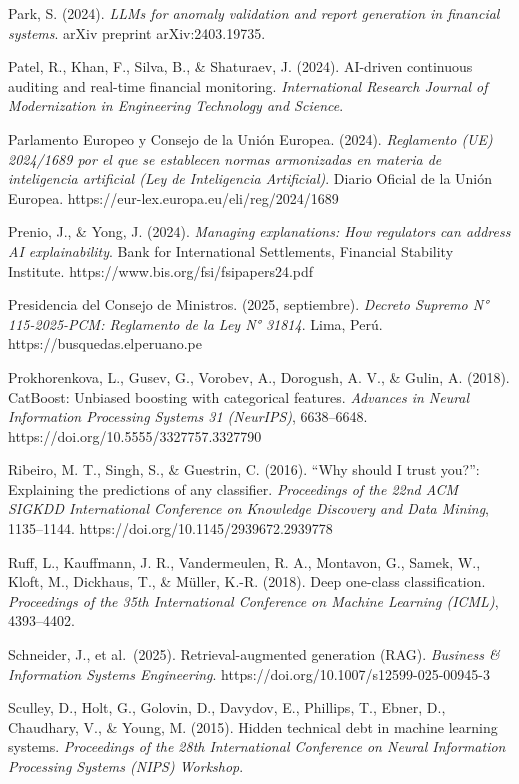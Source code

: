 Park, S. (2024). \emph{LLMs for anomaly validation and report generation
in financial systems}. arXiv preprint arXiv:2403.19735.

Patel, R., Khan, F., Silva, B., \& Shaturaev, J. (2024). AI-driven
continuous auditing and real-time financial monitoring.
\emph{International Research Journal of Modernization in Engineering
Technology and Science}.

Parlamento Europeo y Consejo de la Unión Europea. (2024).
\emph{Reglamento (UE) 2024/1689 por el que se establecen normas
armonizadas en materia de inteligencia artificial (Ley de Inteligencia
Artificial)}. Diario Oficial de la Unión Europea.
https://eur-lex.europa.eu/eli/reg/2024/1689

Prenio, J., \& Yong, J. (2024). \emph{Managing explanations: How
regulators can address AI explainability}. Bank for International
Settlements, Financial Stability Institute.
https://www.bis.org/fsi/fsipapers24.pdf

Presidencia del Consejo de Ministros. (2025, septiembre). \emph{Decreto
Supremo N° 115-2025-PCM: Reglamento de la Ley N° 31814}. Lima, Perú.
https://busquedas.elperuano.pe

Prokhorenkova, L., Gusev, G., Vorobev, A., Dorogush, A. V., \& Gulin, A.
(2018). CatBoost: Unbiased boosting with categorical features.
\emph{Advances in Neural Information Processing Systems 31 (NeurIPS)},
6638--6648. https://doi.org/10.5555/3327757.3327790

Ribeiro, M. T., Singh, S., \& Guestrin, C. (2016). ``Why should I trust
you?'': Explaining the predictions of any classifier. \emph{Proceedings
of the 22nd ACM SIGKDD International Conference on Knowledge Discovery
and Data Mining}, 1135--1144. https://doi.org/10.1145/2939672.2939778

Ruff, L., Kauffmann, J. R., Vandermeulen, R. A., Montavon, G., Samek,
W., Kloft, M., Dickhaus, T., \& Müller, K.-R. (2018). Deep one-class
classification. \emph{Proceedings of the 35th International Conference
on Machine Learning (ICML)}, 4393--4402.

Schneider, J., et al.~(2025). Retrieval-augmented generation (RAG).
\emph{Business \& Information Systems Engineering}.
https://doi.org/10.1007/s12599-025-00945-3

Sculley, D., Holt, G., Golovin, D., Davydov, E., Phillips, T., Ebner,
D., Chaudhary, V., \& Young, M. (2015). Hidden technical debt in machine
learning systems. \emph{Proceedings of the 28th International Conference
on Neural Information Processing Systems (NIPS) Workshop}.

